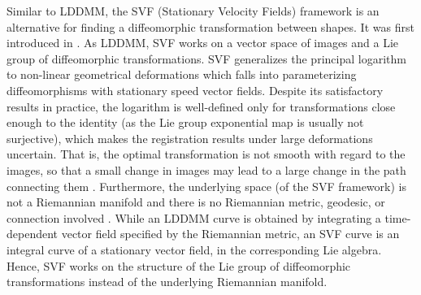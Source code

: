 Similar to LDDMM, the SVF (Stationary Velocity Fields) framework is an alternative for finding a diffeomorphic transformation between shapes. It was first introduced in \cite{arsigny2006log}. As LDDMM, SVF works on a vector space of images and a Lie group of diffeomorphic transformations. SVF generalizes the principal logarithm to non-linear geometrical deformations which falls into parameterizing diffeomorphisms with stationary speed vector fields. Despite its satisfactory results in practice, the logarithm is well-defined only for transformations close enough to the identity (as the Lie group exponential map is usually not surjective), which makes the registration results under large deformations uncertain. That is, the optimal transformation is not smooth with regard to the images, so that a small change in images may lead to a large change in the path connecting them \cite{kobatake2017computational}. Furthermore, the underlying space (of the SVF framework) is not a Riemannian manifold and there is no Riemannian metric, geodesic, or connection involved \cite{kobatake2017computational}. While an LDDMM curve is obtained by integrating a time-dependent vector field specified by the Riemannian metric, an SVF curve is an integral curve of a stationary vector field, in the corresponding Lie algebra. Hence, SVF works on the structure of the Lie group of diffeomorphic transformations instead of the underlying Riemannian manifold. %
 



